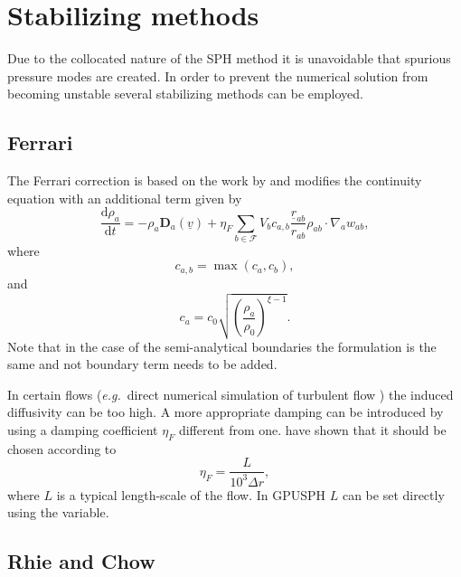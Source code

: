 \documentclass[12pt]{memoir}
\newcommand{\uvec}[1]{\underline{#1}}
\newcommand{\td}{\text{d}}
\newcommand{\tdv}[2]{\frac{\td #1}{\td #2}}
\newcommand{\eg}{\textit{e.g.}~}
\newcommand{\sumF}{\underset{b \in \mathcal{F}}{\sum}}
\newcommand{\Div}{\textbf{D}}
\begin{document}

\section{Stabilizing methods}

Due to the collocated nature of the SPH method it is unavoidable that
spurious pressure modes are created. In order to prevent the numerical
solution from becoming unstable several stabilizing methods can be
employed.

\subsection{Ferrari}

The Ferrari correction is based on the work by 
and modifies the continuity equation with an additional term given by
\begin{equation}
\tdv{\rho_a}{t} = -\rho_a \Div_a(\uvec{v}) + \eta_F \sumF V_b c_{a,b}\frac{\uvec{r}_{ab}}{r_{ab}}\rho_{ab}\cdot\nabla_a w_{ab},
\label{e:ferrari:cont}
\end{equation}
where
\begin{equation}
c_{a,b} = \max(c_a,c_b),
\label{e:ferrari:upw}
\end{equation}
and
\begin{equation}
c_a = c_0\sqrt{\left(\frac{\rho_a}{\rho_0}\right)^{\xi-1}}.
\label{e:ferrari:ca}
\end{equation}
Note that in the case of the semi-analytical boundaries the formulation
is the same and not boundary term needs to be added.

In certain flows (\eg direct numerical simulation of turbulent flow
) the induced diffusivity can be too high.
A more appropriate damping can be introduced by using a damping
coefficient $\eta_F$ different from one.
\cite{mayrhofer_investigation_2013} have shown that it should be chosen
according to
\begin{equation}
\eta_F = \frac{L}{10^3 \Delta r},
\label{e:ferrari:eta}
\end{equation}
where $L$ is a typical length-scale of the flow. In GPUSPH $L$ can be
set directly using the  variable.

\subsection{Rhie and Chow}
\end{document}
